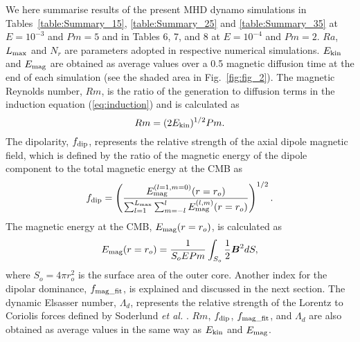 {\color{red}
We here summarise results of the present MHD dynamo simulations in Tables~\ref{table:Summary_15}, \ref{table:Summary_25} and \ref{table:Summary_35} at $E = 10^{-3}$ and $Pm = 5$ and in  Tables 6, 7, and 8
 at $E = 10^{-4}$ and $Pm = 2$.
}
{\color{red}
$Ra$, $L_{\rm max}$ and $N_r$ are parameters adopted in respective numerical simulations.
$E_{\rm kin}$ and $E_{\rm mag}$ are obtained as average values over a 0.5 magnetic diffusion time at the end of each simulation (see the shaded area in Fig.~\ref{fig:fig_2}).
}
{\color{red}
The magnetic Reynolds number, $Rm$, is the ratio of the generation to diffusion terms in the induction equation (\ref{eq:induction}) and is calculated as
%
\begin{equation}
Rm = (2 E_{\rm kin})^{1/2} Pm .
\label{eq:Rm}
\end{equation}
%
The dipolarity, $f_{\rm dip}$, represents the relative strength of the axial dipole magnetic field, which is defined by the ratio of the magnetic energy of the dipole component to the total magnetic energy at the CMB as
%
%
\begin{equation}
f_{\rm dip} = 
\left(
\frac{E_{\rm mag}^{(l=1,m=0)} (r=r_o)}
     {\sum_{l=1}^{L_{\rm max}}
      \sum_{m=-l}^l E_{\rm mag}^{(l,m)} (r=r_o)}
\right)^{1/2}.
\label{eq:f_dip}
\end{equation}
%
The magnetic energy at the CMB, $E_{\rm mag} (r=r_o)$, is calculated as
%
\begin{equation}
E_{\rm mag} (r=r_o) = 
  \frac{1}{S_o E Pm} \int_{S_o} \frac{1}{2} \mbox{\boldmath$B$}^2 dS,
\end{equation}
%
where $S_o = 4\pi r_o^2$ is the surface area of the outer core.
Another index for the dipolar dominance, $f_{\rm mag\_fit}$, is explained and discussed in the next section.
The dynamic Elsasser number, $\Lambda_d$, represents the relative strength of the Lorentz to Coriolis forces defined by Soderlund {\it et al.} .
$Rm$, $f_{\rm dip}$, $f_{\rm mag\_fit}$, and $\Lambda_d$ are also obtained as average values in the same way as $E_{\rm kin}$ and $E_{\rm mag}$.
}

